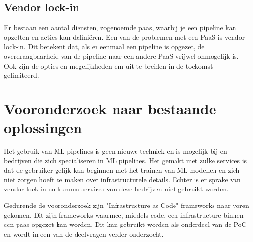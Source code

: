 \subsection{Vendor lock-in}\label{subsec:vendor-lock-in}
Er bestaan een aantal diensten, zogenoemde \acrfull{paas}, waarbij je een pipeline kan opzetten en acties kan definiëren. Een van de problemen met een PaaS is vendor lock-in. Dit betekent dat, als er eenmaal een pipeline is opgezet, de overdraagbaarheid van de pipeline naar een andere PaaS vrijwel onmogelijk is. Ook zijn de opties en mogelijkheden om uit te breiden in de toekomst gelimiteerd. 

\section{Vooronderzoek naar bestaande oplossingen}\label{sec:vooronderzoek-naar-bestaande-oplossingen}
Het gebruik van ML pipelines is geen nieuwe techniek en is mogelijk bij  en bedrijven die zich specialiseren in ML pipelines. Het gemakt met zulke services is dat de gebruiker gelijk kan beginnen met het trainen van ML modellen en zich niet zorgen hoeft te maken over infrastructurele details. Echter is er sprake van vendor lock-in en kunnen services van deze bedrijven niet gebruikt worden.

Gedurende de vooronderzoek zijn "Infrastructure as Code" frameworks naar voren gekomen. Dit zijn frameworks waarmee, middels code, een infrastructure binnen een \gls{paas} opgezet kan worden. Dit kan gebruikt worden als onderdeel van de PoC en wordt in een van de deelvragen verder onderzocht.


